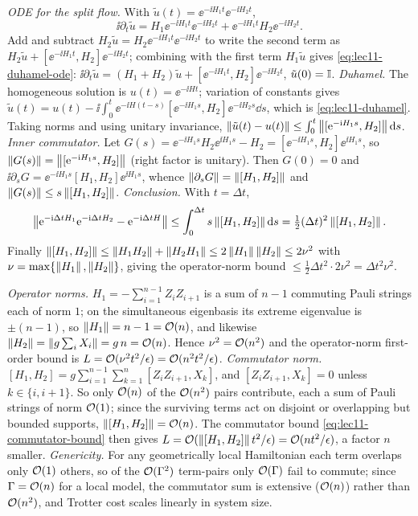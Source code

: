 \begin{solution}
\emph{ODE for the split flow.} With $\tilde u(t)=\ee^{-\ii H_1 t}\ee^{-\ii H_2 t}$,
\[
  \ii\partial_t\tilde u
  =H_1\ee^{-\ii H_1 t}\ee^{-\ii H_2 t}+\ee^{-\ii H_1 t}H_2\ee^{-\ii H_2 t}.
\]
Add and subtract $H_2\tilde u=H_2\ee^{-\ii H_1 t}\ee^{-\ii H_2 t}$ to write the second
term as $H_2\tilde u+[\ee^{-\ii H_1 t},H_2]\ee^{-\ii H_2 t}$; combining with the first
term $H_1\tilde u$ gives \eqref{eq:lec11-duhamel-ode}:
$\ii\partial_t\tilde u=(H_1+H_2)\tilde u+[\ee^{-\ii H_1 t},H_2]\ee^{-\ii H_2 t}$,
$\tilde u(0)=\mathbb{I}$. \emph{Duhamel.} The homogeneous solution is $u(t)=\ee^{-\ii Ht}$;
variation of constants gives
$\tilde u(t)=u(t)-\ii\int_0^t\ee^{-\ii H(t-s)}[\ee^{-\ii H_1 s},H_2]\ee^{-\ii H_2 s}\dd s$,
which is \eqref{eq:lec11-duhamel}. Taking norms and using unitary invariance,
$\left\lVert \tilde u(t)-u(t) \right\rVert\le\int_0^t\left\lVert [\mathrm{e}^{-\mathrm{i} H_1 s},H_2] \right\rVert\mathrm{d} s$.
\emph{Inner commutator.} Let $G(s)=\ee^{-\ii H_1 s}H_2\ee^{\ii H_1 s}-H_2
=[\ee^{-\ii H_1 s},H_2]\ee^{\ii H_1 s}$, so $\left\lVert G(s) \right\rVert=\left\lVert [\mathrm{e}^{-\mathrm{i} H_1 s},H_2] \right\rVert$
(right factor is unitary). Then $G(0)=0$ and
$\ii\partial_s G=\ee^{-\ii H_1 s}[H_1,H_2]\ee^{\ii H_1 s}$, whence
$\left\lVert \partial_s G \right\rVert=\left\lVert [H_1,H_2] \right\rVert$ and $\left\lVert G(s) \right\rVert\le s\left\lVert [H_1,H_2] \right\rVert$.
\emph{Conclusion.} With $t=\Delta t$,
\[
  \left\lVert \mathrm{e}^{-\mathrm{i}\Delta t H_1}\mathrm{e}^{-\mathrm{i}\Delta t H_2}-\mathrm{e}^{-\mathrm{i}\Delta t H} \right\rVert
  \le\int_0^{\Delta t}s\left\lVert [H_1,H_2] \right\rVert\mathrm{d} s=\tfrac12(\Delta t)^2\left\lVert [H_1,H_2] \right\rVert.
\]
Finally $\left\lVert [H_1,H_2] \right\rVert\le\left\lVert H_1H_2 \right\rVert+\left\lVert H_2H_1 \right\rVert\le2\left\lVert H_1 \right\rVert\left\lVert H_2 \right\rVert\le2\nu^2$
with $\nu=\max\{\left\lVert H_1 \right\rVert,\left\lVert H_2 \right\rVert\}$, giving the operator-norm bound
$\le\tfrac12\Delta t^2\cdot2\nu^2=\Delta t^2\nu^2$.
\end{solution}

\begin{solution}
\emph{Operator norms.} $H_1=-\sum_{i=1}^{n-1}Z_iZ_{i+1}$ is a sum of $n-1$ commuting Pauli
strings each of norm $1$; on the simultaneous eigenbasis its extreme eigenvalue is
$\pm(n-1)$, so $\left\lVert H_1 \right\rVert=n-1=\mathcal{O}(n)$, and likewise $\left\lVert H_2 \right\rVert=\left\lVert g\sum_iX_i \right\rVert
=g\,n=\mathcal{O}(n)$. Hence $\nu^2=\mathcal{O}(n^2)$ and the operator-norm first-order bound is
$L=\mathcal{O}(\nu^2 t^2/\epsilon)=\mathcal{O}(n^2t^2/\epsilon)$. \emph{Commutator norm.}
$[H_1,H_2]=g\sum_{i=1}^{n-1}\sum_{k=1}^{n}[Z_iZ_{i+1},X_k]$, and $[Z_iZ_{i+1},X_k]=0$
unless $k\in\{i,i+1\}$. So only $\mathcal{O}(n)$ of the $\mathcal{O}(n^2)$ pairs contribute, each a
sum of Pauli strings of norm $\mathcal{O}(1)$; since the surviving terms act on disjoint or
overlapping but bounded supports, $\left\lVert [H_1,H_2] \right\rVert=\mathcal{O}(n)$. The commutator bound
\eqref{eq:lec11-commutator-bound} then gives $L=\mathcal{O}(\left\lVert [H_1,H_2] \right\rVert t^2/\epsilon)
=\mathcal{O}(nt^2/\epsilon)$, a factor $n$ smaller. \emph{Genericity.} For any geometrically
local Hamiltonian each term overlaps only $\mathcal{O}(1)$ others, so of the $\mathcal{O}(\Gamma^2)$
term-pairs only $\mathcal{O}(\Gamma)$ fail to commute; since $\Gamma=\mathcal{O}(n)$ for a local
model, the commutator sum is extensive ($\mathcal{O}(n)$) rather than $\mathcal{O}(n^2)$, and Trotter
cost scales linearly in system size.
\end{solution}

